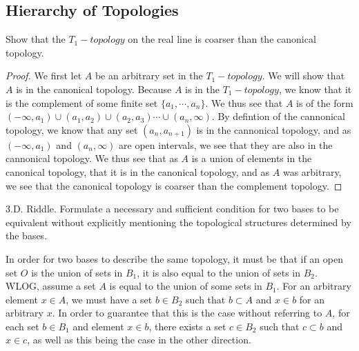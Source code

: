 \subsection{Hierarchy of Topologies}
\begin{minorEx}%
  Show that the $T_1-topology$ on the real line is coarser than the canonical topology.
\end{minorEx}
\begin{proof}
  We first let $A$ be an arbitrary set in the $T_1-topology$. We will show that $A$ is in the canonical topology. Because $A$ is in the $T_1-topology$, we know that it is the complement of some finite set $\{a_1,\cdots,a_n\}$. We thus see that $A$ is of the form $(-\infty,a_1)\cup (a_1,a_2) \cup (a_2,a_3) \cdots \cup (a_n,\infty)$. By defintion of the cannonical topology, we know that any set $(a_n,a_{n+1})$ is in the cannonical topology, and as $(-\infty,a_1)$ and $ (a_n,\infty)$ are open intervals, we see that they are also in the cannonical topology. We thus see that as $A$ is a union of elements in the canonical topology, that it is in the canonical topology, and as $A$ was arbitrary, we see that the canonical topology is coarser than the complement topology.
\end{proof}

\begin{majorEx}
3.D. Riddle. Formulate a necessary and sufficient condition for two bases
to be equivalent without explicitly mentioning the topological structures
determined by the bases.
\end{majorEx}
In order for two bases to describe the same topology, it must be that if an open set $O$ is the union of sets in $B_1$, it is also equal to the union of sets in $B_2$. WLOG, assume a set $A$ is equal to the union of some sets in $B_1$. For an arbitrary element $x \in A$, we must have a set $b \in B_2$ such that $b \subset A$ and $x \in b$ for an arbitrary $x$. In order to guarantee that this is the case without referring to $A$, for each set $b \in B_1$ and element $x \in b$, there exists a set $c \in B_2$ such that $c \subset b$ and $x \in c$, as well as this being the case in the other direction.



